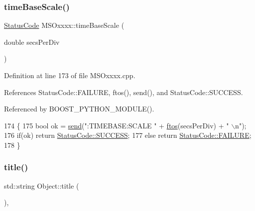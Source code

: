 \subsubsection{\texorpdfstring{time\+Base\+Scale()}{timeBaseScale()}}
{\footnotesize\ttfamily \hyperlink{classStatusCode}{Status\+Code} M\+S\+Oxxxx\+::time\+Base\+Scale (\begin{DoxyParamCaption}\item[{double}]{secs\+Per\+Div }\end{DoxyParamCaption})}



Definition at line 173 of file M\+S\+Oxxxx.\+cpp.



References Status\+Code\+::\+F\+A\+I\+L\+U\+RE, ftos(), send(), and Status\+Code\+::\+S\+U\+C\+C\+E\+SS.



Referenced by B\+O\+O\+S\+T\+\_\+\+P\+Y\+T\+H\+O\+N\+\_\+\+M\+O\+D\+U\+L\+E().


\begin{DoxyCode}
174 \{
175     \textcolor{keywordtype}{bool} ok = \hyperlink{classMSOxxxx_ae77668a1ae4ccb74e0ed5f2485dfdebf}{send}(\textcolor{stringliteral}{":TIMEBASE:SCALE "} + \hyperlink{classMSOxxxx_ab9c897c3dc0a52cbe5a5da67fc520ed7}{ftos}(secsPerDiv) + \textcolor{stringliteral}{" \(\backslash\)n"});
176     \textcolor{keywordflow}{if}(ok)  \textcolor{keywordflow}{return} \hyperlink{classStatusCode_a6f565cbeadc76d14c72f047e5e85eb4badd0da38d3ba0d922efd1f4619bc37ad8}{StatusCode::SUCCESS};
177     \textcolor{keywordflow}{else}        \textcolor{keywordflow}{return} \hyperlink{classStatusCode_a6f565cbeadc76d14c72f047e5e85eb4ba3da73d4c469762eb9d3c960368252b26}{StatusCode::FAILURE};  
178 \}
\end{DoxyCode}
\mbox{\label{classObject_a73a0f1a41828fdd8303dd662446fb6c3}} 
\subsubsection{\texorpdfstring{title()}{title()}}
{\footnotesize\ttfamily std\+::string Object\+::title (\begin{DoxyParamCaption}{ }\end{DoxyParamCaption})\hspace{0.3cm}{\ttfamily [inline]}, {\ttfamily [inherited]}}



